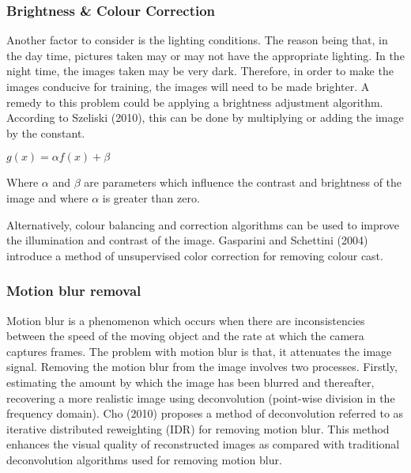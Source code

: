 \documentclass[a4paper, 16pt]{article}
\begin{document}
\subsubsection{ Brightness \& Colour Correction }
Another factor to consider is the lighting conditions. The reason being that, in the day time, pictures taken may or may not have the appropriate lighting. In the night time, the images taken may be very dark. Therefore, in order to make the images conducive for training, the images will need to be made brighter. A remedy to this problem could be applying a brightness adjustment algorithm. According to Szeliski (2010), this can be done by multiplying or adding the image by the constant. 

\begin{center}
 $g(x) = \alpha f(x) + \beta$
\end{center}

Where $\alpha$ and $\beta$ are parameters which influence the contrast and brightness of the image and where $\alpha$ is greater than zero. 

Alternatively, colour balancing and correction algorithms can be used to improve the illumination and contrast of the image. Gasparini and Schettini (2004) introduce a method of unsupervised color correction for removing colour cast. 

\subsubsection{ Motion blur removal}

Motion blur is a phenomenon which occurs when there are inconsistencies between the speed of the moving object and the rate at which the camera captures frames. The problem with motion blur is that, it attenuates the image signal. Removing the motion blur from the image involves two processes. Firstly, estimating the amount by which the image has been blurred and thereafter, recovering a more realistic image using  deconvolution (point-wise division in the frequency domain). Cho (2010) proposes a method of deconvolution referred to as iterative distributed reweighting (IDR) for removing motion blur. This method enhances the visual quality of reconstructed images as compared with traditional deconvolution algorithms used for removing motion blur.
\parskip 0.2in 
\end{document}
